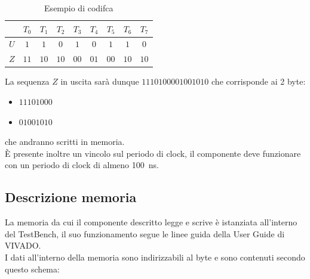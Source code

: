 \documentclass{article}
\begin{document}
\begin{table}[h]
    \centering
    \begin{tabular}{|c|c|c|c|c|c|c|c|c|}
        \hline
         & $T_0$ & $T_1$ & $T_2$ & $T_3$ & $T_4$ & $T_5$ & $T_6$ & $T_7$\\
        \hline 
        $U$ & $1$ & $1$ & $0$ & $1$ & $0$ & $1$ & $1$ & $0$\\
        \hline
        $Z$ & $11$ & $10$ & $10$ & $00$ & $01$ & $00$ & $10$ & $10$\\
        \hline
    \end{tabular}
    \caption{Esempio di codifca}
\end{table}

La sequenza $Z$ in uscita sarà dunque $1110100001001010$ che corrisponde ai 2 byte:
\begin{itemize}
    \item $11101000$
    \item $01001010$
\end{itemize}
 che andranno scritti in memoria.\\
 È presente inoltre un vincolo sul periodo di clock, il componente deve funzionare con un periodo di clock di almeno \SI{100}{\nano\second}.

\subsection{Descrizione memoria}
La memoria da cui il componente descritto legge e scrive è istanziata all'interno del TestBench, il suo funzionamento segue le linee guida della User Guide di VIVADO.\\
I dati all'interno della memoria sono indirizzabili al byte e sono contenuti secondo questo schema:
\end{document}
